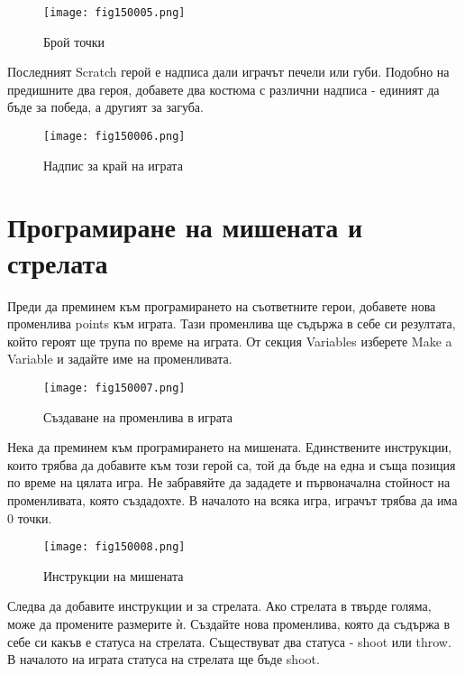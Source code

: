 \begin{figure}[H]
  \centering
  \texttt{[image: fig150005.png]}
  \caption{Брой точки}
\label{fig150005}
\end{figure}

Последният Scratch герой е надписа дали играчът печели или губи. Подобно на предишните два героя, добавете два костюма с различни надписа - единият да бъде за победа, а другият за загуба.

\begin{figure}[H]
  \centering
  \texttt{[image: fig150006.png]}
  \caption{Надпис за край на играта}
\label{fig150006}
\end{figure}

\section{Програмиране на мишената и стрелата}
Преди да преминем към програмирането на съответните герои, добавете нова променлива points към играта. Тази променлива ще съдържа в себе си резултата, който героят ще трупа по време на играта. От секция Variables изберете Make a Variable и задайте име на променливата.

\begin{figure}[H]
  \centering
  \texttt{[image: fig150007.png]}
  \caption{Създаване на променлива в играта}
\label{fig150007}
\end{figure}

Нека да преминем към програмирането на мишената. Единствените инструкции, които трябва да добавите към този герой са, той да бъде на една и съща позиция по време на цялата игра. Не забравяйте да зададете и първоначална стойност на променливата, която създадохте. В началото на всяка игра, играчът трябва да има 0 точки.

\begin{figure}[H]
  \centering
  \texttt{[image: fig150008.png]}
  \caption{Инструкции на мишената}
\label{fig150008}
\end{figure}

Следва да добавите инструкции и за стрелата. Ако стрелата в твърде голяма, може да промените размерите ѝ. Създайте нова променлива, която да съдържа в себе си какъв е статуса на стрелата. Съществуват два статуса - shoot или throw. В началото на играта статуса на стрелата ще бъде shoot.

